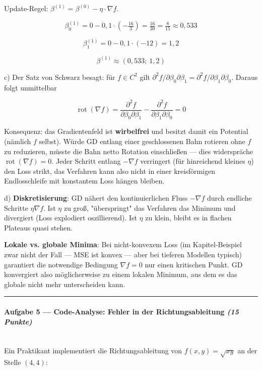 \documentclass[11pt, a4paper]{article}
\begin{document}
Update-Regel: $\beta^{(1)} = \beta^{(0)} - \eta \cdot \nabla f$.

\[
\beta_0^{(1)} = 0 - 0{,}1\cdot\left(-\tfrac{16}{3}\right) = \tfrac{16}{30} = \tfrac{8}{15} \approx 0{,}533
\]

\[
\beta_1^{(1)} = 0 - 0{,}1\cdot(-12) = 1{,}2
\]

\[
\boxed{\beta^{(1)} \approx (0{,}533;\ 1{,}2)}
\]


c) Der Satz von Schwarz besagt: für $f \in C^2$ gilt $\partial^2 f / \partial \beta_0 \partial \beta_1 = \partial^2 f / \partial \beta_1 \partial \beta_0$. Daraus folgt unmittelbar

\[
\operatorname{rot}(\nabla f) = \frac{\partial^2 f}{\partial \beta_0 \partial \beta_1} - \frac{\partial^2 f}{\partial \beta_1 \partial \beta_0} = 0
\]

Konsequenz: das Gradientenfeld ist \textbf{wirbelfrei} und besitzt damit ein Potential (nämlich $f$ selbst). Würde GD entlang einer geschlossenen Bahn rotieren ohne $f$ zu reduzieren, müsste die Bahn netto Rotation einschließen — dies widerspräche $\operatorname{rot}(\nabla f)=0$. Jeder Schritt entlang $-\nabla f$ verringert (für hinreichend kleines $\eta$) den Loss strikt, das Verfahren kann also nicht in einer kreisförmigen Endlosschleife mit konstantem Loss hängen bleiben.


d) \textbf{Diskretisierung}: GD nähert den kontinuierlichen Fluss $-\nabla f$ durch endliche Schritte $\eta \nabla f$. Ist $\eta$ zu groß, "überspringt" das Verfahren das Minimum und divergiert (Loss explodiert oszillierend). Ist $\eta$ zu klein, bleibt es in flachen Plateaus quasi stehen.


\textbf{Lokale vs. globale Minima}: Bei nicht-konvexem Loss (im Kapitel-Beispiel zwar nicht der Fall — MSE ist konvex — aber bei tieferen Modellen typisch) garantiert die notwendige Bedingung $\nabla f = 0$ nur einen kritischen Punkt. GD konvergiert also möglicherweise zu einem lokalen Minimum, aus dem es das globale nicht mehr unterscheiden kann.



\noindent\textcolor{rulegray}{\rule{\linewidth}{0.4pt}}


\paragraph{Aufgabe 5 — Code-Analyse: Fehler in der Richtungsableitung \textit{(15 Punkte)}}\mbox{}\\[2pt]

Ein Praktikant implementiert die Richtungsableitung von $f(x,y) = \sqrt{xy}$ an der Stelle $(4,4)$:
\end{document}
